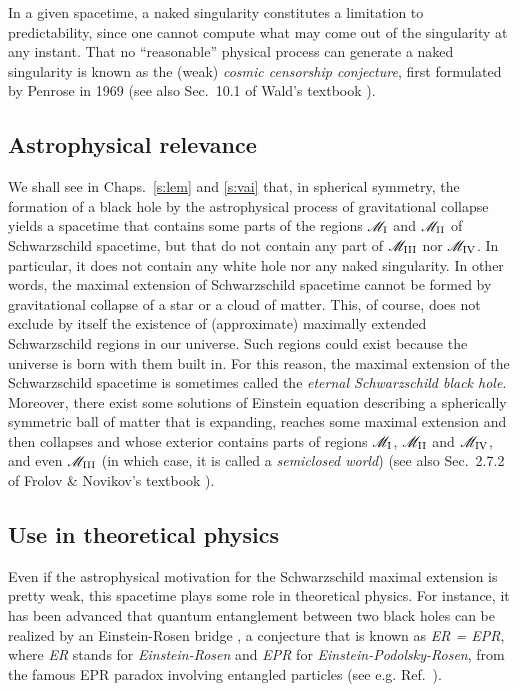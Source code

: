 In a given spacetime, a naked singularity constitutes a limitation to predictability, since one cannot compute what may come out of the singularity at any instant.
That no ``reasonable'' physical process
can generate a naked singularity is known as the (weak) \emph{cosmic censorship conjecture}, first
formulated by Penrose in 1969 \cite{Penro69} (see also Sec.~10.1 of Wald's textbook \cite{Wald84}).


\subsection{Astrophysical relevance}

We shall see in Chaps.~\ref{s:lem} and \ref{s:vai} that, in spherical symmetry,
the formation of a black hole by the astrophysical
process of gravitational collapse yields a spacetime
that contains some parts of the regions $\mathscr{M}_{\rm I}$
and $\mathscr{M}_{\rm II}$ of Schwarzschild spacetime, but that do not contain
any part of $\mathscr{M}_{\rm III}$ nor $\mathscr{M}_{\rm IV}$. In particular, it does not contain any white hole nor
any naked singularity. In other words, the maximal extension of Schwarzschild spacetime
cannot be formed by gravitational collapse of a star or a cloud of matter.
This, of course, does not exclude by itself the existence of (approximate) maximally extended Schwarzschild regions in our universe. Such regions could exist because the universe is born
with them built in. For this reason, the maximal extension of the Schwarzschild spacetime
is sometimes called the \emph{eternal Schwarzschild black hole}.
Moreover, there exist some solutions of Einstein equation describing a
spherically symmetric ball of matter that is
expanding, reaches some maximal extension and then collapses and whose
exterior contains parts of regions $\mathscr{M}_{\rm I}$, $\mathscr{M}_{\rm II}$ and $\mathscr{M}_{\rm IV}$, and even $\mathscr{M}_{\rm III}$ (in which case, it is called a \emph{semiclosed world}) \cite{Novik63} (see also Sec.~2.7.2 of Frolov \& Novikov's textbook \cite{FroloN98}).

\subsection{Use in theoretical physics}

Even if the astrophysical motivation for the Schwarzschild maximal extension is pretty weak,
this spacetime plays some role in theoretical physics. For instance, it has been advanced
that quantum entanglement between two black holes can be realized by an Einstein-Rosen bridge
\cite{MaldaS13}, a conjecture that is known as \emph{ER = EPR},
where \emph{ER} stands for \emph{Einstein-Rosen} and  \emph{EPR} for \emph{Einstein-Podolsky-Rosen}, from the famous EPR paradox
involving entangled particles (see e.g. Ref.~\cite{LeBel06}).
